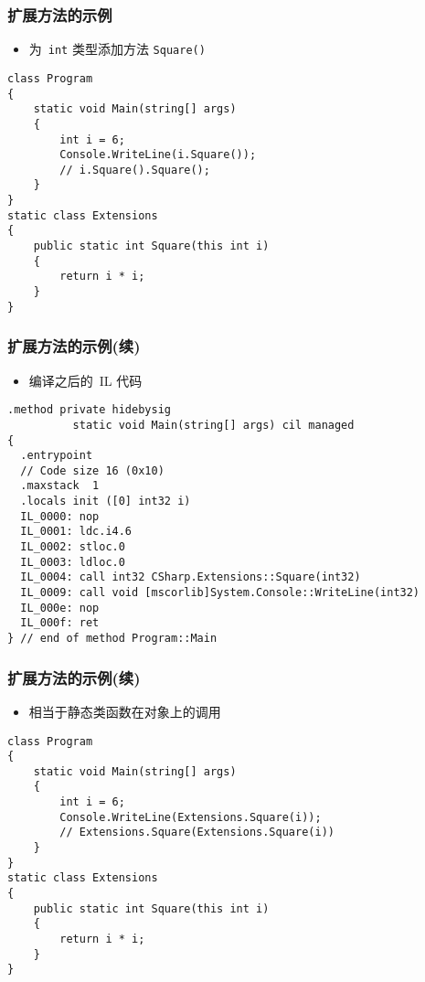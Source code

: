 \begin{frame}[fragile]
\frametitle{扩展方法的示例}
\begin{itemize}
\item 为~\texttt{int} 类型添加方法 \texttt{Square()}
\end{itemize}
\begin{lstlisting}
class Program
{
    static void Main(string[] args)
    {
        int i = 6;
        Console.WriteLine(i.Square());
        // i.Square().Square();
    }
}
static class Extensions
{
    public static int Square(this int i)
    {
        return i * i;
    }
}

\end{lstlisting}
\end{frame}

\begin{frame}[fragile]
\frametitle{扩展方法的示例(续)}

\begin{itemize}
\item 编译之后的~IL 代码
\end{itemize}
\begin{lstlisting}
.method private hidebysig
          static void Main(string[] args) cil managed
{
  .entrypoint
  // Code size 16 (0x10)
  .maxstack  1
  .locals init ([0] int32 i)
  IL_0000: nop
  IL_0001: ldc.i4.6
  IL_0002: stloc.0
  IL_0003: ldloc.0
  IL_0004: call int32 CSharp.Extensions::Square(int32)
  IL_0009: call void [mscorlib]System.Console::WriteLine(int32)
  IL_000e: nop
  IL_000f: ret
} // end of method Program::Main
\end{lstlisting}
\end{frame}


\begin{frame}[fragile]
\frametitle{扩展方法的示例(续)}
\begin{itemize}
\item 相当于静态类函数在对象上的调用
\end{itemize}
\begin{lstlisting}
class Program
{
    static void Main(string[] args)
    {
        int i = 6;
        Console.WriteLine(Extensions.Square(i));
        // Extensions.Square(Extensions.Square(i))
    }
}
static class Extensions
{
    public static int Square(this int i)
    {
        return i * i;
    }
}

\end{lstlisting}
\end{frame}


